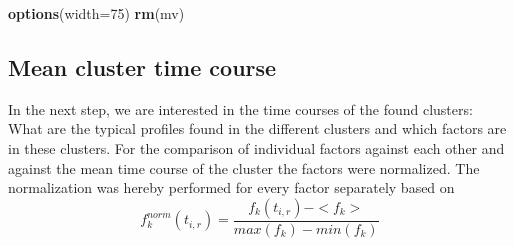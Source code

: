 \documentclass[]{article}
\newenvironment{Shaded}{\begin{snugshade}}{\end{snugshade}}
\newcommand{\KeywordTok}[1]{\textcolor[rgb]{0.13,0.29,0.53}{\textbf{{#1}}}}
\newcommand{\DataTypeTok}[1]{\textcolor[rgb]{0.13,0.29,0.53}{{#1}}}
\newcommand{\DecValTok}[1]{\textcolor[rgb]{0.00,0.00,0.81}{{#1}}}
\newcommand{\NormalTok}[1]{{#1}}
\begin{document}
\begin{Shaded}
\begin{Highlighting}[]
\KeywordTok{options}\NormalTok{(}\DataTypeTok{width=}\DecValTok{75}\NormalTok{)}
\KeywordTok{rm}\NormalTok{(mv)}
\end{Highlighting}
\end{Shaded}

\normalsize

\subsection{Mean cluster time course}\label{mean-cluster-time-course}

In the next step, we are interested in the time courses of the found
clusters: What are the typical profiles found in the different clusters
and which factors are in these clusters. For the comparison of
individual factors against each other and against the mean time course
of the cluster the factors were normalized. The normalization was hereby
performed for every factor separately based on
\[f_{k}^{norm}(t_{i,r}) = \frac{f_{k}(t_{i,r})-<f_{k}>}{max(f_{k})-min(f_{k})}\]
\end{document}
